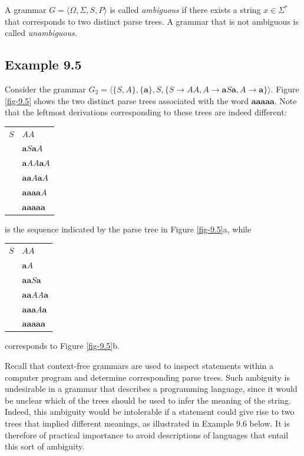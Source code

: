\begin{dfn}\label{dfn-9.4}
A grammar $G=\langle\Omega,\Sigma,S,P\rangle$ is called \emph{ambiguous}
if there exists a string $x\in\Sigma^*$ that corresponds to two distinct parse
trees. A grammar that is not ambiguous is called \emph{unambiguous}.
\end{dfn}

\subsection*{Example 9.5}

Consider the grammar $G_2=\langle\{S,A\},\{\pmb{a}\},S,\{S\rightarrow AA,A
\rightarrow\pmb{a}S\pmb{a},A\rightarrow\pmb{a}\}\rangle$. Figure \ref{fig-9.5} shows the
two distinct parse trees associated with the word $\pmb{aaaaa}$. Note that the
leftmost derivations corresponding to these trees are indeed different:
\begin{center}\begin{tabular}{r@{ $\Rightarrow$ }l}
$S$ & $AA$ \\
& $\pmb{a}S\pmb{a}A$ \\
& $\pmb{a}AA\pmb{a}A$ \\
& $\pmb{aa}A\pmb{a}A$ \\
& $\pmb{aaaa}A$ \\
& $\pmb{aaaaa}$
\end{tabular}\end{center}
is the sequence indicated by the parse tree in Figure \ref{fig-9.5}a, while
\begin{center}\begin{tabular}{r@{ $\Rightarrow$ }l}
$S$ & $AA$ \\
& $\pmb{a}A$ \\
& $\pmb{aa}S\pmb{a}$ \\
& $\pmb{aa}AA\pmb{a}$ \\
& $\pmb{aaa}A\pmb{a}$ \\
& $\pmb{aaaaa}$
\end{tabular}\end{center}
corresponds to Figure \ref{fig-9.5}b.

Recall that context-free grammars are used to inspect statements within a
computer program and determine corresponding parse trees. Such ambiguity is
undesirable in a grammar that describes a programming language, since it would
be unclear which of the trees should be used to infer the meaning of the string.
Indeed, this ambiguity would be intolerable if a statement could give rise to
two trees that implied different meanings, as illustrated in Example 9.6 below.
It is therefore of practical importance to avoid descriptions of languages that
entail this sort of ambiguity.

